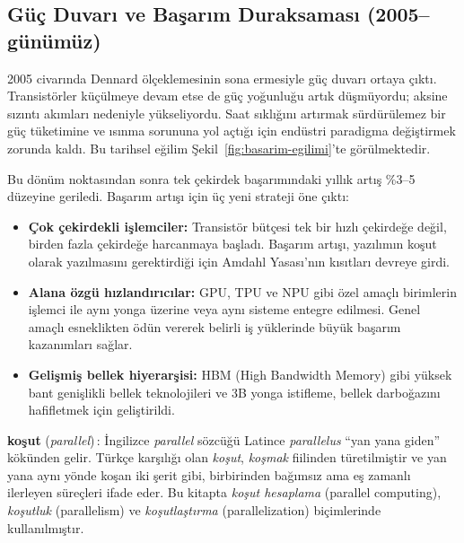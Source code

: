 \subsection{Güç Duvarı ve Başarım Duraksaması (2005--günümüz)}
\label{subsec:guc-duvari-basarim}

2005 civarında Dennard ölçeklemesinin sona ermesiyle güç duvarı ortaya çıktı. Transistörler küçülmeye devam etse de güç yoğunluğu artık düşmüyordu; aksine sızıntı akımları nedeniyle yükseliyordu. Saat sıklığını artırmak sürdürülemez bir güç tüketimine ve ısınma sorununa yol açtığı için endüstri paradigma değiştirmek zorunda kaldı. Bu tarihsel eğilim Şekil~\ref{fig:basarim-egilimi}'te görülmektedir.

Bu dönüm noktasından sonra tek çekirdek başarımındaki yıllık artış \%3--5 düzeyine geriledi. Başarım artışı için üç yeni strateji öne çıktı:

\begin{itemize}
    \item \textbf{Çok çekirdekli işlemciler:} Transistör bütçesi tek bir hızlı çekirdeğe değil, birden fazla çekirdeğe harcanmaya başladı. Başarım artışı, yazılımın koşut olarak yazılmasını gerektirdiği için Amdahl Yasası'nın kısıtları devreye girdi.

    \item \textbf{Alana özgü hızlandırıcılar:} GPU, TPU ve NPU gibi özel amaçlı birimlerin işlemci ile aynı yonga üzerine veya aynı sisteme entegre edilmesi. Genel amaçlı esneklikten ödün vererek belirli iş yüklerinde büyük başarım kazanımları sağlar.

    \item \textbf{Gelişmiş bellek hiyerarşisi:} HBM (High Bandwidth Memory) gibi yüksek bant genişlikli bellek teknolojileri ve 3B yonga istifleme, bellek darboğazını hafifletmek için geliştirildi.
\end{itemize}

\begin{terimnotu}
\textbf{koşut} (\emph{parallel})\,: İngilizce \emph{parallel} sözcüğü Latince \emph{parallelus} ``yan yana giden'' kökünden gelir. Türkçe karşılığı olan \emph{koşut}, \emph{koşmak} fiilinden türetilmiştir ve yan yana aynı yönde koşan iki şerit gibi, birbirinden bağımsız ama eş zamanlı ilerleyen süreçleri ifade eder. Bu kitapta \emph{koşut hesaplama} (parallel computing), \emph{koşutluk} (parallelism) ve \emph{koşutlaştırma} (parallelization) biçimlerinde kullanılmıştır.
\end{terimnotu}


